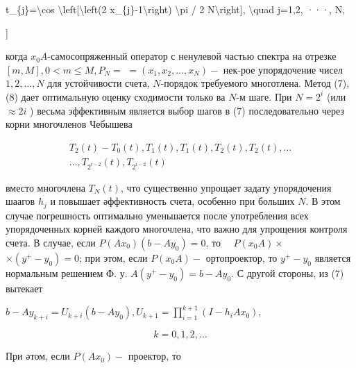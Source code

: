 \documentclass[10pt]{article}
\begin{document}
t\_\{j\}=\textbackslash cos \textbackslash left[\textbackslash left(2 x\_\{j\}-1\textbackslash right) \textbackslash pi / 2 N\textbackslash right], \textbackslash quad j=1,2, ···, N,

]



когда $x_{0} A$-самосопряженный оператор с ненулевой частью спектра на отрезке $[m, M], 0<m \leqslant M, P_{N}=$ $=\left(x_{1}, x_{2}, \ldots, x_{N}\right)-$ нек-рое упорядочение чисел $1,2, \ldots, N$ для устойчивости счета, $N$-порядок требуемого многотлена. Метод (7), (8) дает оптимальную оценку сходимости только ва $N$-м шаге. При $N=2^{i}$ (или $\approx 2 i$ ) весьма эффективным является выбор шагов в (7) последовательно через корни многочленов Чебышева



\[

\begin{gathered}

T_{2}(t)-T_{0}(t), T_{1}(t), T_{1}(t), T_{2}(t), T_{2}(t), \ldots \\

\ldots, T_{2^{i-2}}(t), T_{2^{i-2}}(t)

\end{gathered}

\]



вместо многочлена $T_{N}(t)$, что существенно упрощает задату упорядочения шаагов $h_{j}$ и повышает әффективность счета, особенно при больших $N$. В этом случае погрешность оптимально уменьшается после употребления всех упорядоченных корней каждого многочлена, что важно для упрощения контроля счета. В случае, если $P\left(A x_{0}\right)\left(b-A y_{0}\right)=0$, то $\quad P\left(x_{0} A\right) \times$ $\times\left(y^{+}-y_{0}\right)=0$; при этом, если $P\left(x_{0} A\right)-$ ортопроектор, то $y^{+}-y_{0}$ является нормальным решением Ф. у. $A\left(y^{+}-y_{0}\right)=b-A y_{0}$. С другой стороны, из (7) вытекает



$b-A y_{k+i}=U_{k+i}\left(b-A y_{0}\right), U_{k+1}=\prod_{i=1}^{k+1}\left(I-h_{i} A x_{0}\right)$,



\[

k=0,1,2, \ldots

\]



При әтом, если $P\left(A x_{0}\right)-$ проектор, то
\end{document}
